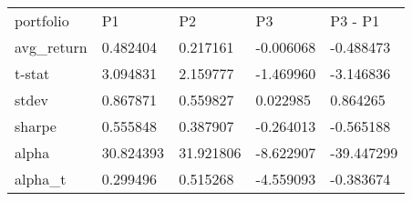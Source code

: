 \begin{tabular}{lllll}
\toprule
\midrule
portfolio & P1 & P2 & P3 & P3 - P1 \\
avg_return & 0.482404 & 0.217161 & -0.006068 & -0.488473 \\
t-stat & 3.094831 & 2.159777 & -1.469960 & -3.146836 \\
stdev & 0.867871 & 0.559827 & 0.022985 & 0.864265 \\
sharpe & 0.555848 & 0.387907 & -0.264013 & -0.565188 \\
alpha & 30.824393 & 31.921806 & -8.622907 & -39.447299 \\
alpha_t & 0.299496 & 0.515268 & -4.559093 & -0.383674 \\
\bottomrule
\end{tabular}
